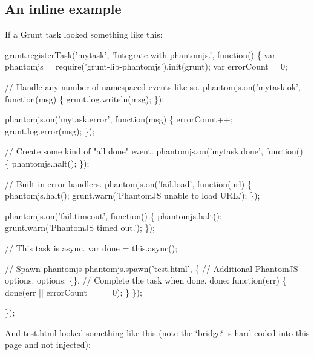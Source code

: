 \subsection*{An inline example}

If a Grunt task looked something like this\+:


\begin{DoxyCode}
grunt.registerTask(\textcolor{stringliteral}{'mytask'}, \textcolor{stringliteral}{'Integrate with phantomjs.'}, \textcolor{keyword}{function}() \{
  var phantomjs = require(\textcolor{stringliteral}{'grunt-lib-phantomjs'}).init(grunt);
  var errorCount = 0;

  \textcolor{comment}{// Handle any number of namespaced events like so.}
  phantomjs.on(\textcolor{stringliteral}{'mytask.ok'}, \textcolor{keyword}{function}(msg) \{
    grunt.log.writeln(msg);
  \});

  phantomjs.on(\textcolor{stringliteral}{'mytask.error'}, \textcolor{keyword}{function}(msg) \{
    errorCount++;
    grunt.log.error(msg);
  \});

  \textcolor{comment}{// Create some kind of "all done" event.}
  phantomjs.on(\textcolor{stringliteral}{'mytask.done'}, \textcolor{keyword}{function}() \{
    phantomjs.halt();
  \});

  \textcolor{comment}{// Built-in error handlers.}
  phantomjs.on(\textcolor{stringliteral}{'fail.load'}, \textcolor{keyword}{function}(url) \{
    phantomjs.halt();
    grunt.warn(\textcolor{stringliteral}{'PhantomJS unable to load URL.'});
  \});

  phantomjs.on(\textcolor{stringliteral}{'fail.timeout'}, \textcolor{keyword}{function}() \{
    phantomjs.halt();
    grunt.warn(\textcolor{stringliteral}{'PhantomJS timed out.'});
  \});

  \textcolor{comment}{// This task is async.}
  var done = this.async();

  \textcolor{comment}{// Spawn phantomjs}
  phantomjs.spawn(\textcolor{stringliteral}{'test.html'}, \{
    \textcolor{comment}{// Additional PhantomJS options.}
    options: \{\},
    \textcolor{comment}{// Complete the task when done.}
    done: \textcolor{keyword}{function}(err) \{
      done(err || errorCount === 0);
    \}
  \});

\});
\end{DoxyCode}


And {\ttfamily test.\+html} looked something like this (note the \char`\"{}bridge\char`\"{} is hard-\/coded into this page and not injected)\+:


